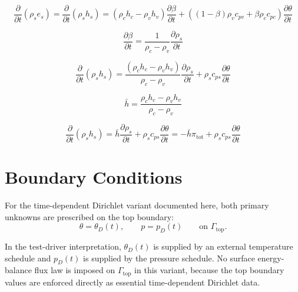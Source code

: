 \documentclass[11pt]{article}
\begin{document}
\begin{equation}
\frac{\partial }{\partial t} \left( \rho_{s} e_{s} \right) = \frac{\partial }{\partial t} \left( \rho_{s} h_{s} \right) = \left( \rho_{c} h_{c} - \rho_{v} h_{v} \right) \frac{\partial \beta}{\partial t} + \left( (1 - \beta) \rho_{v} c_{pv} + \beta \rho_{c} c_{pc} \right) \frac{\partial \theta}{\partial t}
\end{equation}

\begin{equation}
    \frac{\partial \beta}{\partial t} = \frac{1}{\rho_{c} - \rho_{v}} \frac{\partial \rho_{s}}{\partial t}
\end{equation}

\begin{equation}
\frac{\partial }{\partial t} \left( \rho_{s} h_{s} \right) = \frac{\left( \rho_{c} h_{c} - \rho_{v} h_{v} \right)}{\rho_{c} - \rho_{v}} \frac{\partial \rho_{s}}{\partial t} + \rho_{s} c_{ps} \frac{\partial \theta}{\partial t}
\end{equation}

\begin{equation}
    \bar{h} = \frac{\rho_{c} h_{c} - \rho_{v} h_{v}}{\rho_{c} - \rho_{v}}
\end{equation}

\begin{equation}
\frac{\partial }{\partial t} \left( \rho_{s} h_{s} \right) = \bar{h} \frac{\partial \rho_{s}}{\partial t} + \rho_{s} c_{ps} \frac{\partial \theta}{\partial t} = - \bar{h} \pi_{\mathrm{tot}} + \rho_{s} c_{ps} \frac{\partial \theta}{\partial t}
\end{equation}

\section{Boundary Conditions}

For the time-dependent Dirichlet variant documented here, both primary
unknowns are prescribed on the top boundary:
\begin{equation}
\theta = \theta_D(t),
\qquad
p = p_D(t)
\qquad \text{on } \Gamma_{\mathrm{top}}.
\end{equation}

In the test-driver interpretation, $\theta_D(t)$ is supplied by an external
temperature schedule and $p_D(t)$ is supplied by the pressure schedule. No
surface energy-balance flux law is imposed on $\Gamma_{\mathrm{top}}$ in this
variant, because the top boundary values are enforced directly as essential
time-dependent Dirichlet data.
\end{document}
